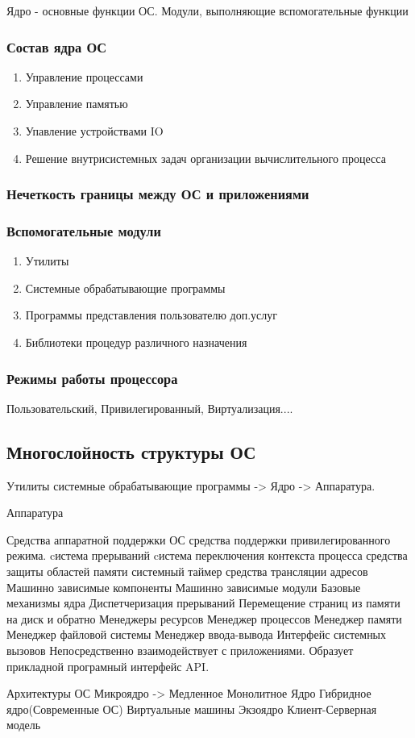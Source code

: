 \documentclass[a4paper]{article}
\begin{document}
Ядро - основные функции ОС.
Модули, выполняющие вспомогательные функции

\subsubsection{Состав ядра ОС}
\begin{enumerate}
\item Управление процессами
\item Управление памятью
\item Упавление устройствами IO
\item Решение внутрисистемных задач организации вычислительного процесса
\end{enumerate}
\subsubsection{Нечеткость границы между ОС и приложениями}

\subsubsection{Вспомогательные модули}
\begin{enumerate}
\item Утилиты 
\item Системные обрабатывающие программы
\item Программы представления пользователю доп.услуг
\item Библиотеки процедур различного назначения
\end{enumerate}
\subsubsection{Режимы работы процессора}
    Пользовательский, Привилегированный, Виртуализация....

\subsection{Многослойность структуры ОС}
Утилиты системные обрабатывающие программы -> Ядро -> Аппаратура.

Аппаратура

Средства аппаратной поддержки ОС
    средства поддержки привилегированного режима. 
    cистема прерываний
    cистема переключения контекста процесса
    средства защиты областей памяти
    системный таймер
    средства трансляции адресов
Машинно зависимые компоненты
Машинно зависимые модули
Базовые механизмы ядра
    Диспетчеризация прерываний
    Перемещение страниц из памяти на диск и обратно
Менеджеры ресурсов
    Менеджер процессов
    Менеджер памяти
    Менеджер файловой системы
    Менеджер ввода-вывода
Интерфейс системных вызовов
    Непосредственно взаимодействует с приложениями. Образует прикладной програмный интерфейс API.

Архитектуры ОС
Микроядро -> Медленное
Монолитное Ядро
Гибридное ядро(Современные ОС)
Виртуальные машины
Экзоядро
Клиент-Серверная модель
\end{document}
